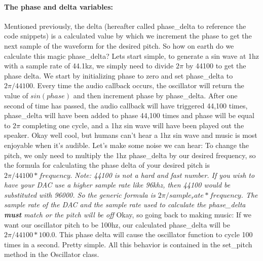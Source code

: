 \documentclass[acmlarge,screen]{acmart}
\begin{document}
	\paragraph{The phase and delta variables:} Mentioned previously, the delta (hereafter called phase\_delta to reference the code snippets) is a calculated value by which we increment the phase to get the next sample of the waveform for the desired pitch. So how on earth do we calculate this magic phase\_delta? Lets start simple, to generate a sin wave at 1hz with a sample rate of 44.1kz, we simply need to divide \( 2\pi \) by 44100 to get the phase delta. We start by initializing phase to zero and set phase\_delta to \( 2\pi/44100 \). Every time the audio callback occurs, the oscillator will return the value of \( sin(phase) \) and then increment phase by phase\_delta. After one second of time has passed, the audio callback will have triggered 44,100 times, phase\_delta will have been added to phase 44,100 times and phase will be equal to \( 2\pi \) completing one cycle, and a 1hz sin wave will have been played out the speaker. Okay well cool, but humans can't hear a 1hz sin wave and music is most enjoyable when it's audible. Let's make some noise we can hear: To change the pitch, we only need to multiply the 1hz phase\_delta by our desired frequency, so the formula for calculating the phase delta of your desired pitch is \( 2\pi/44100 * frequency \). \textit{Note: 44100 is not a hard and fast number. If you wish to have your DAC use a higher sample rate like 96khz, then 44100 would be substituted with 96000. So the generic formula is \( 2\pi/sample_rate * frequency \). The sample rate of the DAC and the sample rate used to calculate the phase\_delta \textbf{must} match or the pitch will be off} Okay, so going back to making music: If we want our oscillator pitch to be 100hz, our calculated phase\_delta will be \( 2\pi/44100 * 100.0\). This phase delta will cause the oscillator function to cycle 100 times in a second. Pretty simple. All this behavior is contained in the set\_pitch method in the Oscillator class.
	
\end{document}
